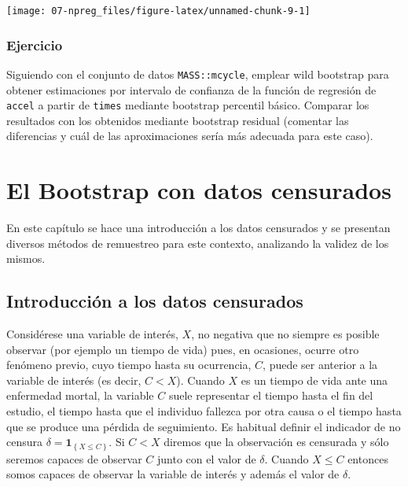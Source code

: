 \documentclass[
]{book}
\theoremstyle{break}
\theoremstyle{definition}
\theoremstyle{definition}
\theoremstyle{definition}
\theoremstyle{definition}
\theoremstyle{remark}
\begin{document}
\begin{center}\texttt{[image: 07-npreg\_files/figure-latex/unnamed-chunk-9-1]} \end{center}

\hypertarget{ejercicio-1}{%
\subsection{Ejercicio}\label{ejercicio-1}}

Siguiendo con el conjunto de datos \texttt{MASS::mcycle}, emplear wild bootstrap para
obtener estimaciones por intervalo de confianza de la función de regresión
de \texttt{accel} a partir de \texttt{times} mediante bootstrap percentil básico.
Comparar los resultados con los obtenidos mediante bootstrap residual (comentar las diferencias y cuál de las aproximaciones sería más adecuada para este caso).

\hypertarget{bootcen}{%
\chapter{El Bootstrap con datos censurados}\label{bootcen}}

En este capítulo se hace una introducción a los datos censurados y se
presentan diversos métodos de remuestreo para este contexto, analizando
la validez de los mismos.

\hypertarget{introducciuxf3n-a-los-datos-censurados}{%
\section{Introducción a los datos censurados}\label{introducciuxf3n-a-los-datos-censurados}}

Considérese una variable de interés, \(X\), no negativa que no siempre es
posible observar (por ejemplo un tiempo de vida) pues, en ocasiones,
ocurre otro fenómeno previo, cuyo tiempo hasta su ocurrencia, \(C\), puede
ser anterior a la variable de interés (es decir, \(C<X\)). Cuando \(X\) es
un tiempo de vida ante una enfermedad mortal, la variable \(C\) suele
representar el tiempo hasta el fin del estudio, el tiempo hasta que el
individuo fallezca por otra causa o el tiempo hasta que se produce una
pérdida de seguimiento. Es habitual definir el indicador de no censura
\(\delta =\mathbf{1}_{\left\{ X\leq C\right\} }\). Si \(C<X\) diremos que la
observación es censurada y sólo seremos capaces de observar \(C\) junto
con el valor de \(\delta\). Cuando \(X\leq C\) entonces somos capaces de
observar la variable de interés y además el valor de \(\delta\).
\end{document}
